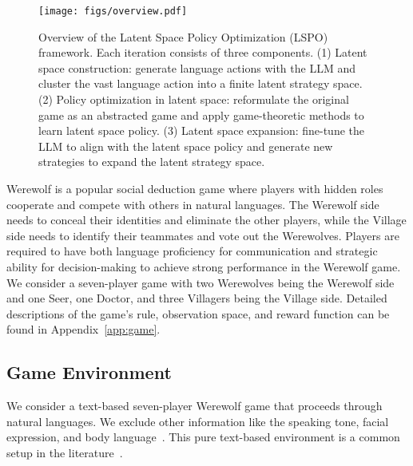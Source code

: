 
\begin{figure*}[t]
    \centering
    \texttt{[image: figs/overview.pdf]}
    \caption{Overview of the Latent Space Policy Optimization (LSPO) framework. Each iteration consists of three components. (1) Latent space construction: generate language actions with the LLM and cluster the vast language action into a finite latent strategy space. (2) Policy optimization in latent space: reformulate the original game as an abstracted game and apply game-theoretic methods to learn latent space policy. (3) Latent space expansion: fine-tune the LLM to align with the latent space policy and generate new strategies to expand the latent strategy space.}
    \label{fig:overview}
\end{figure*}

Werewolf is a popular social deduction game where players with hidden roles cooperate and compete with others in natural languages. The Werewolf side needs to conceal their identities and eliminate the other players, while the Village side needs to identify their teammates and vote out the Werewolves. Players are required to have both language proficiency for communication and strategic ability for decision-making to achieve strong performance in the Werewolf game. We consider a seven-player game with two Werewolves being the Werewolf side and one Seer, one Doctor, and three Villagers being the Village side.
Detailed descriptions of the game's rule, observation space, and reward function can be found in Appendix~\ref{app:game}. 

\subsection{Game Environment}

We consider a text-based seven-player Werewolf game that proceeds through natural languages. We exclude other information like the speaking tone, facial expression, and body language~\cite{lai2022werewolf}. This pure text-based environment is a common setup in the literature~\cite{xu2023exploring,xu2023language,wu2024enhance,bailis2024werewolf}. 

